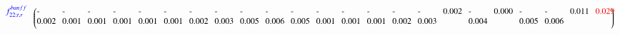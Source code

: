 {\begin{sideways}
\begin{minipage}{23cm}
{\begin{equation*}
\begin{blockarray}{c p{18pt}p{18pt}p{18pt}p{18pt}p{18pt}p{18pt}p{18pt}p{18pt}p{18pt}p{18pt}p{18pt}p{18pt}p{18pt}p{18pt}p{18pt}p{18pt}p{18pt}p{18pt}p{18pt}p{18pt}p{18pt}p{18pt}p{18pt}}
\begin{block}{c(p{18pt}p{18pt}p{18pt}p{18pt}p{18pt}p{18pt}p{18pt}p{18pt}p{18pt}p{18pt}p{18pt}p{18pt}p{18pt}p{18pt}p{18pt}p{18pt}p{18pt}p{18pt}p{18pt}p{18pt}p{18pt}p{18pt}p{18pt}@{\hspace*{1pt}})}
{\color{blue} f_{22; t, r}^{banff}}  \vspace{0.2cm} &     -0.002 &     -0.001 &     -0.001 &     -0.001 &     -0.001 &     -0.001 &     -0.002 &     -0.003 &     -0.005 &     -0.006 &     -0.005 &     -0.001 &     -0.001 &     -0.001 &     -0.002 &     -0.003 &      0.002 &     -0.004 &      0.000 &     -0.005 &     -0.006 &      0.011 & {\color{red} 0.029} \\ 
\end{block}
\label{eq:Cbanff}
\end{blockarray}
\end{equation*}
}
\end{minipage}
\end{sideways}
\normalsize
}
